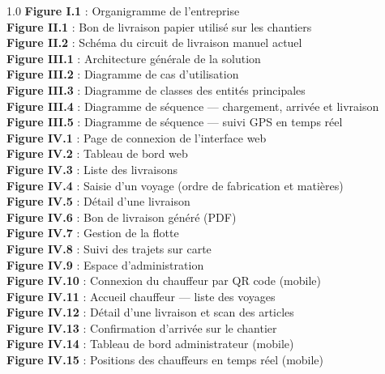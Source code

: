 \documentclass[12pt,a4paper]{report}
\begin{document}
\begin{spacing}{1.0}
\textbf{Figure I.1} : Organigramme de l'entreprise  \\

\textbf{Figure II.1} : Bon de livraison papier utilisé sur les chantiers  \\
\textbf{Figure II.2} : Schéma du circuit de livraison manuel actuel  \\

\textbf{Figure III.1} : Architecture générale de la solution  \\
\textbf{Figure III.2} : Diagramme de cas d'utilisation  \\
\textbf{Figure III.3} : Diagramme de classes des entités principales  \\
\textbf{Figure III.4} : Diagramme de séquence — chargement, arrivée et livraison  \\
\textbf{Figure III.5} : Diagramme de séquence — suivi GPS en temps réel  \\

\textbf{Figure IV.1} : Page de connexion de l'interface web  \\
\textbf{Figure IV.2} : Tableau de bord web  \\
\textbf{Figure IV.3} : Liste des livraisons  \\
\textbf{Figure IV.4} : Saisie d'un voyage (ordre de fabrication et matières)  \\
\textbf{Figure IV.5} : Détail d'une livraison  \\
\textbf{Figure IV.6} : Bon de livraison généré (PDF)  \\
\textbf{Figure IV.7} : Gestion de la flotte  \\
\textbf{Figure IV.8} : Suivi des trajets sur carte  \\
\textbf{Figure IV.9} : Espace d'administration  \\
\textbf{Figure IV.10} : Connexion du chauffeur par QR code (mobile)  \\
\textbf{Figure IV.11} : Accueil chauffeur — liste des voyages  \\
\textbf{Figure IV.12} : Détail d'une livraison et scan des articles  \\
\textbf{Figure IV.13} : Confirmation d'arrivée sur le chantier  \\
\textbf{Figure IV.14} : Tableau de bord administrateur (mobile)  \\
\textbf{Figure IV.15} : Positions des chauffeurs en temps réel (mobile)  \\
\end{spacing}
\end{document}
